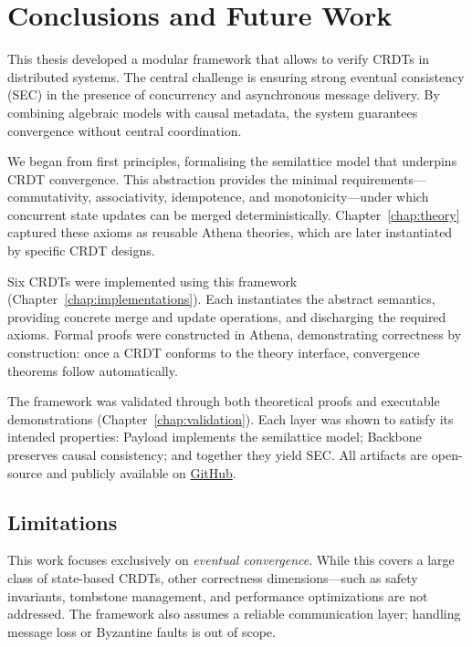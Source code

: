 
\chapter{Conclusions and Future Work}\label{cha:conclusion}


This thesis developed a modular framework that allows to verify CRDTs in distributed systems. The central challenge is ensuring strong eventual consistency (SEC) in the presence of concurrency and asynchronous message delivery. By combining algebraic models with causal metadata, the system guarantees convergence without central coordination.

We began from first principles, formalising the semilattice model that underpins CRDT convergence. This abstraction provides the minimal requirements—commutativity, associativity, idempotence, and monotonicity—under which concurrent state updates can be merged deterministically. Chapter~\ref{chap:theory} captured these axioms as reusable Athena theories, which are later instantiated by specific CRDT designs.


Six CRDTs were implemented using this framework (Chapter~\ref{chap:implementations}). Each instantiates the abstract semantics, providing concrete merge and update operations, and discharging the required axioms. Formal proofs were constructed in Athena, demonstrating correctness by construction: once a CRDT conforms to the theory interface, convergence theorems follow automatically.

The framework was validated through both theoretical proofs and executable demonstrations (Chapter~\ref{chap:validation}). Each layer was shown to satisfy its intended properties: Payload implements the semilattice model; Backbone preserves causal consistency; and together they yield SEC. All artifacts are open-source and publicly available on \href{https://github.com/FLAGlab/Athena-CRDTs}{GitHub}.

\section*{Limitations}

This work focuses exclusively on \emph{eventual convergence}. While this covers a large class of state-based CRDTs, other correctness dimensions—such as safety invariants, tombstone management, and performance optimizations are not addressed. The framework also assumes a reliable communication layer; handling message loss or Byzantine faults is out of scope.

\endinput

